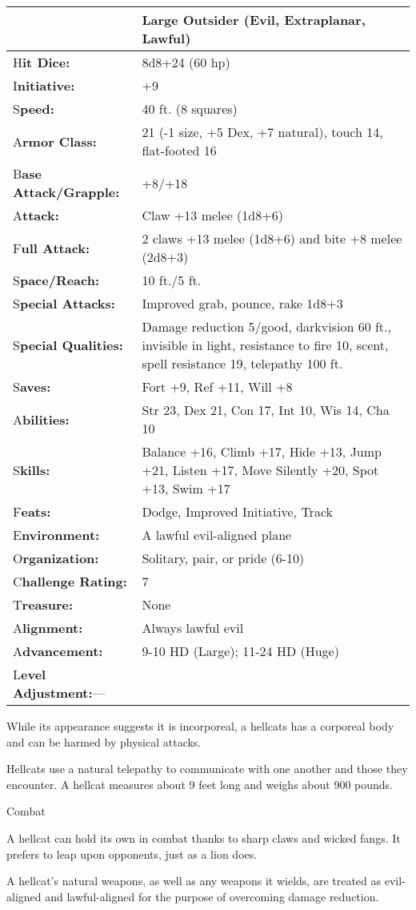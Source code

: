 \documentclass{article}
\begin{document}
\begin{tabular}{|>{\raggedright}p{91pt}|>{\raggedright}p{231pt}|}
\hline
  & Large Outsider (Evil, Extraplanar, Lawful)\tabularnewline
\hline
H\textbf{it Dice:} & 8d8+24 (60 hp)\tabularnewline
\hline
I\textbf{nitiative:} & +9\tabularnewline
\hline
S\textbf{peed:} & 40 ft. (8 squares)\tabularnewline
\hline
A\textbf{rmor Class:} & 21 (-1 size, +5 Dex, +7 natural), touch 14, flat-footed 
16\tabularnewline
\hline
B\textbf{ase Attack/Grapple:} & +8/+18\tabularnewline
\hline
A\textbf{ttack:} & Claw +13 melee (1d8+6)\tabularnewline
\hline
F\textbf{ull Attack:} & 2 claws +13 melee (1d8+6) and bite +8 melee (2d8+3)\tabularnewline
\hline
S\textbf{pace/Reach:} & 10 ft./5 ft.\tabularnewline
\hline
S\textbf{pecial Attacks:} & Improved grab, pounce, rake 1d8+3\tabularnewline
\hline
S\textbf{pecial Qualities:} & Damage reduction 5/good, darkvision 60 ft., invisible 
in light, resistance to fire 10, scent, spell resistance 19, telepathy 100 ft.\tabularnewline
\hline
S\textbf{aves:} & Fort +9, Ref +11, Will +8\tabularnewline
\hline
A\textbf{bilities:} & Str 23, Dex 21, Con 17, Int 10, Wis 14, Cha 10\tabularnewline
\hline
S\textbf{kills:} & Balance +16, Climb +17, Hide +13, Jump +21, Listen +17, Move 
Silently +20, Spot +13, Swim +17\tabularnewline
\hline
F\textbf{eats:} & Dodge, Improved Initiative, Track\tabularnewline
\hline
E\textbf{nvironment:} & A lawful evil-aligned plane\tabularnewline
\hline
O\textbf{rganization:} & Solitary, pair, or pride (6-10)\tabularnewline
\hline
C\textbf{hallenge Rating:} & 7\tabularnewline
\hline
T\textbf{reasure:} & None\tabularnewline
\hline
A\textbf{lignment:} & Always lawful evil\tabularnewline
\hline
A\textbf{dvancement:} & 9-10 HD (Large); 11-24 HD (Huge)\tabularnewline
\hline
L\textbf{evel Adjustment:}--- & \tabularnewline
\hline
\end{tabular}

While its appearance suggests it is incorporeal, a hellcats has a corporeal body 
and can be harmed by physical attacks.

Hellcats use a natural telepathy to communicate with one another and those they 
encounter. A hellcat measures about 9 feet long and weighs about 900 pounds.

Combat

A hellcat can hold its own in combat thanks to sharp claws and wicked fangs. It 
prefers to leap upon opponents, just as a lion does.

A hellcat's natural weapons, as well as any weapons it wields, are treated as evil-aligned 
and lawful-aligned for the purpose of overcoming damage reduction.
\end{document}
